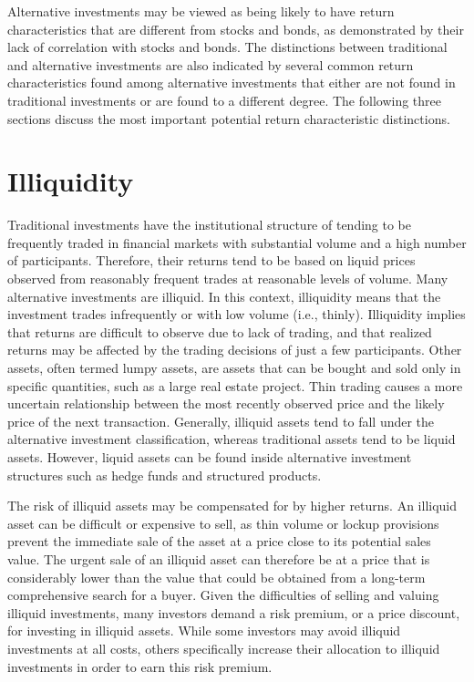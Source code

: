 \documentclass[11pt]{article}
\begin{document}
Alternative investments may be viewed as being likely to have return characteristics that are different from stocks and bonds, as demonstrated by their lack of correlation with stocks and bonds. The distinctions between traditional and alternative investments are also indicated by several common return characteristics found among alternative investments that either are not found in traditional investments or are found to a different degree. The following three sections discuss the most important potential return characteristic distinctions.

\section*{Illiquidity}
Traditional investments have the institutional structure of tending to be frequently traded in financial markets with substantial volume and a high number of participants. Therefore, their returns tend to be based on liquid prices observed from reasonably frequent trades at reasonable levels of volume. Many alternative investments are illiquid. In this context, illiquidity means that the investment trades infrequently or with low volume (i.e., thinly). Illiquidity implies that returns are difficult to observe due to lack of trading, and that realized returns may be affected by the trading decisions of just a few participants. Other assets, often termed lumpy assets, are assets that can be bought and sold only in specific quantities, such as a large real estate project. Thin trading causes a more uncertain relationship between the most recently observed price and the likely price of the next transaction. Generally, illiquid assets tend to fall under the alternative investment classification, whereas traditional assets tend to be liquid assets. However, liquid assets can be found inside alternative investment structures such as hedge funds and structured products.

The risk of illiquid assets may be compensated for by higher returns. An illiquid asset can be difficult or expensive to sell, as thin volume or lockup provisions prevent the immediate sale of the asset at a price close to its potential sales value. The urgent sale of an illiquid asset can therefore be at a price that is considerably lower than the value that could be obtained from a long-term comprehensive search for a buyer. Given the difficulties of selling and valuing illiquid investments, many investors demand a risk premium, or a price discount, for investing in illiquid assets. While some investors may avoid illiquid investments at all costs, others specifically increase their allocation to illiquid investments in order to earn this risk premium.
\end{document}
